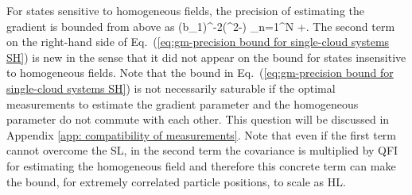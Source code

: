 
For states sensitive to homogeneous fields,
the precision of estimating the gradient is bounded from above as
\be
\label{eq:gm-precision bound for single-cloud systems SH}
(\Delta b_1)^{-2}\leqslant (\sigma^2-\eta) \sum_{n=1}^N +\eta {}.
\ee
The second term on the right-hand side of
Eq.~(\ref{eq:gm-precision bound for single-cloud systems SH})
is new in the sense that it did not appear on
the bound for states insensitive to
homogeneous fields.
Note that the bound in
Eq.~(\ref{eq:gm-precision bound for single-cloud systems SH}) is not
necessarily saturable if the optimal measurements to estimate
the gradient parameter and the homogeneous
parameter do not commute with each other.
This question will be discussed in Appendix \ref{app: compatibility
of measurements}.
Note that even if the first term cannot overcome the SL, in the second term the covariance is multiplied by QFI for estimating the homogeneous field and therefore this concrete term can make the bound, for extremely correlated particle positions, to scale as HL.

